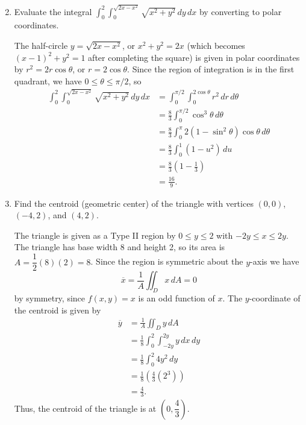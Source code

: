 \documentclass[12pt]{article}
\newcommand{\points}[1]{\marginpar{\hspace{24pt}[#1]}}
\newcommand{\di}{\displaystyle}
\begin{document}
\begin{enumerate}
\begin{multicols}{2}
\end{multicols}

\newpage
\item Evaluate the integral $\di \int_0^2\int_0^{\sqrt{2x-x^2}}\sqrt{x^2+y^2}\,dy\,dx$ by converting to polar coordinates. \points{6}

\bigskip

The half-circle $y=\sqrt{2x-x^2}$, or $x^2+y^2=2x$ (which becomes $(x-1)^2+y^2=1$ after completing the square) is given in polar coordinates by $r^2=2r\cos\theta$, or $r=2\cos\theta$. Since the region of integration is in the first quadrant, we have $0\leq \theta\leq \pi/2$, so
\begin{align*}
 \int_0^2\int_0^{\sqrt{2x-x^2}}\sqrt{x^2+y^2}\,dy\,dx & = \int_0^{\pi/2}\int_0^{2\cos\theta}r^2\,dr\,d\theta\\
& = \frac{8}{3}\int_0^{\pi/2}\cos^3\theta\,d\theta\\
& = \frac{8}{3}\int_0^{\pi}{2}(1-\sin^2\theta)\cos\theta\,d\theta\\
& = \frac{8}{3}\int_0^1(1-u^2)\,du\\
& = \frac{8}{3}\left(1-\frac{1}{3}\right)\\
& = \frac{16}{9}.
\end{align*}

\bigskip



\item Find the centroid (geometric center) of the triangle with vertices $(0,0)$, $(-4,2)$, and $(4,2)$. \points{8}

\bigskip

The triangle is given as a Type II region by $0\leq y\leq 2$ with $-2y\leq x\leq 2y$. The triangle has base width 8 and height 2, so its area is $A = \dfrac{1}{2}(8)(2) = 8$. Since the region is symmetric about the $y$-axis we have
\[
 \overline{x} = \frac{1}{A}\iint_D x\,dA = 0
\]
by symmetry, since $f(x,y)=x$ is an odd function of $x$. The $y$-coordinate of the centroid is given by
\begin{align*}
 \overline{y}& = \frac{1}{A}\iint_D y\,dA\\
& = \frac{1}{8}\int_0^2\int_{-2y}^{2y}y\,dx\,dy\\
& = \frac{1}{8}\int_0^2 4y^2\,dy\\
& = \frac{1}{8}\left(\frac{4}{3}(2^3)\right)\\
& = \frac{4}{3}.
\end{align*}
Thus, the centroid of the triangle is at $\left(0,\dfrac{4}{3}\right)$.
\newpage


\end{enumerate}
\end{document}
